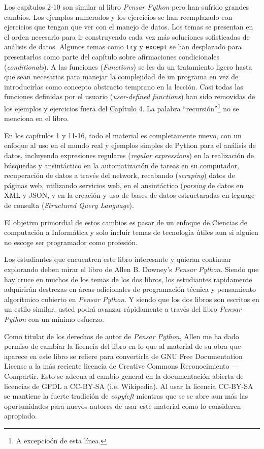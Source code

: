 Los cap\'itulos 2-10 son similar al libro \emph{Pensar Python}
pero han sufrido grandes cambios. Los ejemplos numerados y los ejercicios se han reemplazado con ejercicios que tengan que ver con el manejo de datos. 
Los temas se presentan en el orden necesario para ir construyendo cada vez m\'as soluciones sofisticadas de an\'alisis de datos. Algunos temas como {\tt try} y
{\tt except} se han desplazado para presentarlos como parte del cap\'itulo sobre afirmaciones condicionales (\textit{conditionals}).  A las funciones (\textit{Functions}) se les da un tratamiento ligero hasta que sean necesarias para manejar la complejidad de un programa en vez de introducirlas como concepto abstracto temprano en la lecci\'on. Casi todas las funciones definidas por el usuario (\textit{user-defined functions}) han sido removidas de los ejemplos y ejercicios fuera del Cap\'itulo 4.
La palabra ``recursi\'on''\footnote{A excepcio\'on de esta l\'inea.}
no se menciona en el libro.

En los cap\'itulos 1 y 11-16, todo el material es completamente nuevo, con un enfoque al uso en el mundo real y ejemplos simples de Python para el an\'alisis de datos, incluyendo expresiones regulares (\textit{regular expressions}) en la realizaci\'on de b\'usquedas y an\alisis sint\'actico en la automatizaci\'on de tareas en su computador, recuperaci\'on de datos a trav\'es del network, recabando (\textit{scraping}) datos de p\'aginas web, utilizando servicios web, en el an\alisis sint\'actico (\textit{parsing} de datos en XML y JSON, y en la creaci\'on y uso de bases de datos estructaradas en leguage de consulta (\textit{Structured Query Language}).

El objetivo primordial de estos cambios es pasar de un enfoque de Ciencias de computaci\'on a Inform\'atica y solo incluir temas de tecnolog\'ia \'utiles aun si alguien no escoge ser programador como profesi\'on.

Los estudiantes que encuentren este libro interesante y quieran continuar explorando deben mirar el libro de Allen B. Downey's \emph{Pensar Python}. Siendo que hay cruce en muchos de los temas de los dos libros,
los estudiantes rapidamente adquirir\'an destrezas en \'areas adicionales de programaci\'on t\'ecnica y pensamiento algor\'itmico cubierto en \emph{Pensar Python}.
Y siendo que los dos libros son escritos en un estilo similar, usted podr\'a avanzar r\'apidamente a trav\'es del libro \emph{Pensar Python} con un m\'inimo esfuerzo.

Como titular de los derechos de autor de \emph{Pensar Python},
Allen me ha dado permiso de cambiar la licencia del libro en lo que al material de su obra que aparece en este libro se refiere para convertirla de GNU Free Documentation License 
a la m\'as reciente licencia de Creative Commons Reconocimiento --- Compartir. Esto se adecua al cambio general en la documentaci\'on abierta de licencias de GFDL a CC-BY-SA (i.e. Wikipedia).
Al usar la licencia CC-BY-SA se mantiene la fuerte tradici\'on de \textit{copyleft} mientras  que se se abre aun m\'as las oportunidades para nuevos autores de usar este material como lo consideren apropiado.

